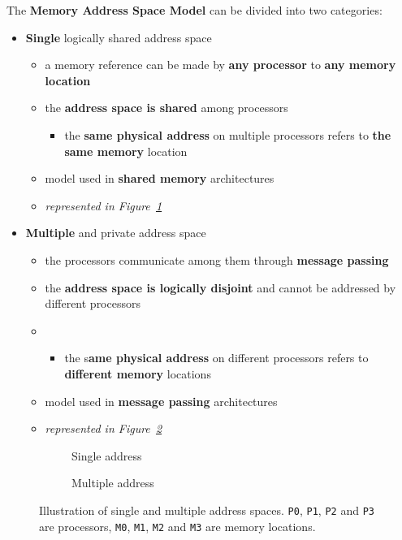 \documentclass[english]{article}
\begin{document}
\bigskip
The \textbf{Memory Address Space Model} can be divided into two categories:

\begin{itemize}
  \item \textbf{Single} logically shared address space
        \begin{itemize}
          \item a memory reference can be made by \textbf{any processor} to \textbf{any memory location}
          \item the \textbf{address space is shared} among processors
                \begin{itemize}[label=\(\rightarrow\)]
                  \item the \textbf{same physical address} on multiple processors refers to \textbf{the same memory} location
                \end{itemize}
          \item model used in \textbf{shared memory} architectures
          \item \textit{represented in Figure~\ref{subfig:single-address-space}}
        \end{itemize}
  \item \textbf{Multiple} and private address space
        \begin{itemize}
          \item the processors communicate among them through \textbf{message passing}
          \item the \textbf{address space is logically disjoint} and cannot be addressed by different processors
          \item \begin{itemize}[label=\(\rightarrow\)]
                  \item the s\textbf{ame physical address} on different processors refers to \textbf{different memory} locations
                \end{itemize}
          \item model used in \textbf{message passing} architectures
          \item \textit{represented in Figure~\ref{subfig:multiple-address-space}}
        \end{itemize}
\end{itemize}

\begin{figure}[htbp]
  \bigskip
  \centering
  \begin{subfigure}[b]{0.495\textwidth}
    \centering
    \caption{Single address}
    \label{subfig:single-address-space}
  \end{subfigure}
  \begin{subfigure}[b]{0.495\textwidth}
    \centering
    \caption{Multiple address}
    \label{subfig:multiple-address-space}
  \end{subfigure}
  \caption{Illustration of single and multiple address spaces. \texttt{P0}, \texttt{P1}, \texttt{P2} and \texttt{P3} are processors, \texttt{M0}, \texttt{M1}, \texttt{M2} and \texttt{M3} are memory locations.}
  \label{fig:address-spaces}
  \bigskip
\end{figure}
\end{document}
